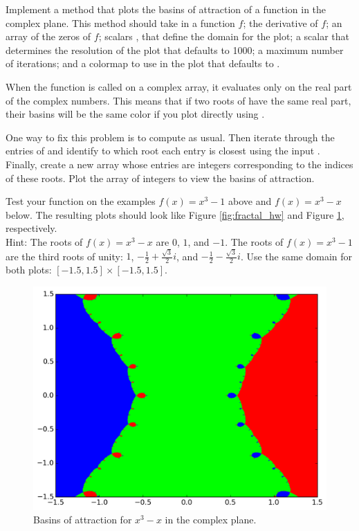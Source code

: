 \begin{problem}
Implement a method that plots the basins of attraction of a function in the complex plane. This method should take in a function $f$; the derivative of $f$; an array of the zeros of $f$; scalars ,  that define the domain for the plot; a scalar that determines the resolution of the plot that defaults to 1000; a maximum number of iterations; and a colormap to use in the plot that defaults to .

When the function  is called on a complex array, it evaluates only on the real part of the complex numbers.
This means that if two roots of  have the same real part, their basins will be the same color if you plot directly using .

One way to fix this problem is to compute  as usual.
Then iterate through the entries of  and identify to which root each entry is closest using the input .
Finally, create a new array whose entries are integers corresponding to the indices of these roots.
Plot the array of integers to view the basins of attraction.

Test your function on the examples $f(x) = x^3-1$ above and $f(x)=x^3-x$ below. The resulting plots should look like Figure \ref{fig:fractal_hw} and Figure \ref{fig:fractal_ex}, respectively.
\\Hint: The roots of $f(x) = x^3-x$ are $0$, $1$, and $-1$. The roots of $f(x) = x^3-1$ are the third roots of unity: $1$, $-\frac{1}{2} + \frac{\sqrt{3}}{2}i$, and $-\frac{1}{2} - \frac{\sqrt{3}}{2}i$. Use the same domain for both plots: $[-1.5, 1.5] \times [-1.5, 1.5]$.
\end{problem}
\clearpage

\begin{figure}[H]
\centering
\includegraphics[width=.7\textwidth]{figures/fractal_ex.png}
\caption{ Basins of attraction for $x^3-x$ in the complex plane.}
\label{fig:fractal_ex}
\end{figure}

